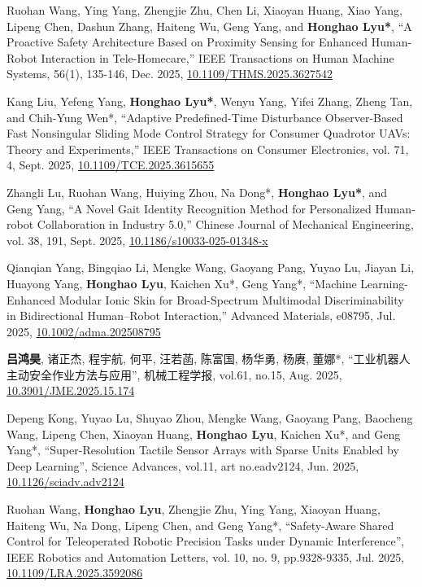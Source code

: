 \begin{enumerate}[align=left, widest={[\textbf{S.1}]}, itemindent=0em, label={\textbf{[\arabic*]}]
    \item[\textbf{[J.29]}] Ruohan Wang, Ying Yang, Zhengjie Zhu, Chen Li, Xiaoyan Huang, Xiao Yang, Lipeng Chen, Dashun Zhang, Haiteng Wu, Geng Yang, and \textbf{Honghao Lyu*}, ``A Proactive Safety Architecture Based on Proximity Sensing for Enhanced Human-Robot Interaction in Tele-Homecare,'' IEEE Transactions on Human Machine Systems, 56(1), 135-146, Dec. 2025, \href{http://doi.org/10.1109/THMS.2025.3627542}{10.1109/THMS.2025.3627542}
    \item[\textbf{[J.28]}] Kang Liu, Yefeng Yang, \textbf{Honghao Lyu*}, Wenyu Yang, Yifei Zhang, Zheng Tan, and Chih-Yung Wen*, ``Adaptive Predefined-Time Disturbance Observer-Based Fast Nonsingular Sliding Mode Control Strategy for Consumer Quadrotor UAVs: Theory and Experiments,'' IEEE Transactions on Consumer Electronics, vol. 71, 4, Sept. 2025, \href{http://doi.org/10.1109/TCE.2025.3615655}{10.1109/TCE.2025.3615655}
    \item[\textbf{[J.27]}] Zhangli Lu, Ruohan Wang, Huiying Zhou, Na Dong*, \textbf{Honghao Lyu*}, and Geng Yang, ``A Novel Gait Identity Recognition Method for Personalized Human-robot Collaboration in Industry 5.0,'' Chinese Journal of Mechanical Engineering, vol. 38, 191, Sept. 2025, \href{http://doi.org/10.1186/s10033-025-01348-x}{10.1186/s10033-025-01348-x}
    \item[\textbf{[J.26]}] Qianqian Yang, Bingqiao Li, Mengke Wang, Gaoyang Pang, Yuyao Lu, Jiayan Li, Huayong Yang, \textbf{Honghao Lyu}, Kaichen Xu*, Geng Yang*, ``Machine Learning-Enhanced Modular Ionic Skin for Broad-Spectrum Multimodal Discriminability in Bidirectional Human--Robot Interaction,'' Advanced Materials, e08795, Jul. 2025, \href{http://doi.org/10.1002/adma.202508795}{10.1002/adma.202508795}
    \item[\textbf{[J.25]}] \textbf{吕鸿昊}, 诸正杰, 程宇航, 何平, 汪若菡, 陈富国, 杨华勇, 杨赓, 董娜*, ``工业机器人主动安全作业方法与应用'', 机械工程学报, vol.61, no.15, Aug. 2025, \href{http://doi.org/10.3901/JME.2025.15.174}{10.3901/JME.2025.15.174}
    \item[\textbf{[J.24]}] Depeng Kong, Yuyao Lu, Shuyao Zhou, Mengke Wang, Gaoyang Pang, Baocheng Wang, Lipeng Chen, Xiaoyan Huang, \textbf{Honghao Lyu}, Kaichen Xu*, and Geng Yang*, ``Super-Resolution Tactile Sensor Arrays with Sparse Units Enabled by Deep Learning'', Science Advances, vol.11, art no.eadv2124, Jun. 2025, \href{http://doi.org/10.1126/sciadv.adv2124}{10.1126/sciadv.adv2124}
    \item[\textbf{[J.23]}] Ruohan Wang, \textbf{Honghao Lyu}, Zhengjie Zhu, Ying Yang, Xiaoyan Huang, Haiteng Wu, Na Dong, Lipeng Chen, and Geng Yang*, ``Safety-Aware Shared Control for Teleoperated Robotic Precision Tasks under Dynamic Interference'', IEEE Robotics and Automation Letters, vol. 10, no. 9, pp.9328-9335, Jul. 2025, \href{http://doi.org/10.1109/LRA.2025.3592086}{10.1109/LRA.2025.3592086}

\end{enumerate}
